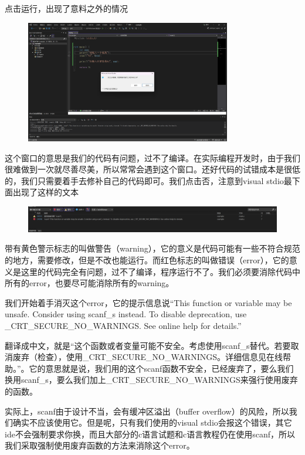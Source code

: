 点击运行，出现了意料之外的情况

\begin{figure}[H]
    \centering
    \includegraphics[width=0.8\textwidth, height=0.4\textheight]{images/1标准输入报错.png}
\end{figure}

这个窗口的意思是我们的代码有问题，过不了编译。在实际编程开发时，由于我们很难做到一次就尽善尽美，所以常常会遇到这个窗口。还好代码的试错成本是很低的，我们只需要着手去修补自己的代码即可。我们点击否，注意到visual stdio最下面出现了这样的文本

\begin{figure}[H]
    \centering
    \includegraphics[width=\textwidth, height=0.2\textheight]{images/1ide错误提示.png}
\end{figure}

带有黄色警示标志的叫做警告（warning），它的意义是代码可能有一些不符合规范的地方，需要修改，但是不改也能运行。而红色标志的叫做错误（error），它的意义是这里的代码完全有问题，过不了编译，程序运行不了。我们必须要消除代码中所有的error，也要尽可能消除所有的warning。

我们开始着手消灭这个error，它的提示信息说“This function or variable may be unsafe. Consider using scanf\_s instead. To disable deprecation, use \_CRT\_SECURE\_NO\_WARNINGS. See online help for details.”

翻译成中文，就是“这个函数或者变量可能不安全。考虑使用scanf\_s替代。若要取消废弃（检查），使用\_CRT\_SECURE\_NO\_WARNINGS。详细信息见在线帮助。”。它的意思就是说，我们用的这个scanf函数不安全，已经废弃了，要么我们换用scanf\_s，要么我们加上\_CRT\_SECURE\_NO\_WARNINGS来强行使用废弃的函数。

实际上，scanf由于设计不当，会有缓冲区溢出（buffer overflow）的风险，所以我们确实不应该使用它。但是呢，只有我们使用的visual stdio会报这个错误，其它ide不会强制要求你换，而且大部分的c语言试题和c语言教程仍在使用scanf，所以我们采取强制使用废弃函数的方法来消除这个error。

